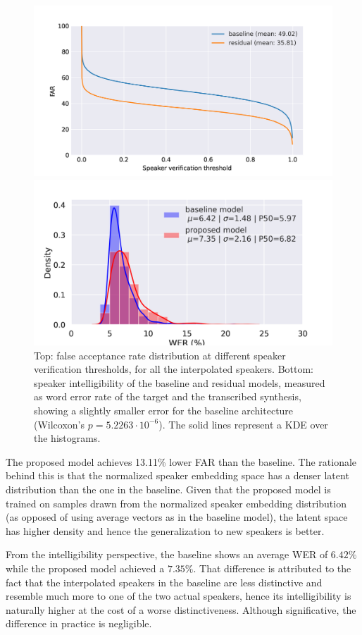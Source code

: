 \begin{figure}[h!]
	\centering
	\includegraphics[width=0.7\linewidth]{tts/images/far_svps}

	\includegraphics[width=0.7\linewidth]{tts/images/wer_svps}
	\caption{Top: false acceptance rate distribution at different speaker verification thresholds, for all the interpolated speakers. Bottom: speaker intelligibility of the baseline and residual models, measured as word error rate of the target and the transcribed synthesis, showing a slightly smaller error for the baseline architecture (Wilcoxon's $p=5.2263\cdot 10^{-6}$). The solid lines represent a KDE over the histograms.}
	\label{fig:svps}
\end{figure}

The proposed model achieves 13.11\% lower FAR than the baseline. The rationale behind this is that the normalized speaker embedding space has a denser latent distribution than the one in the baseline. Given that the proposed model is trained on samples drawn from the normalized speaker embedding distribution (as opposed of using average vectors as in the baseline model), the latent space has higher density and hence the generalization to new speakers is better.



From the intelligibility perspective, the baseline shows an average WER of $6.42\%$ while the proposed model achieved a $7.35\%$. That difference is attributed to the fact that the interpolated speakers in the baseline are less distinctive and resemble much more to one of the two actual speakers, hence its intelligibility is naturally higher at the cost of a worse distinctiveness. Although significative, the difference in practice is negligible.


